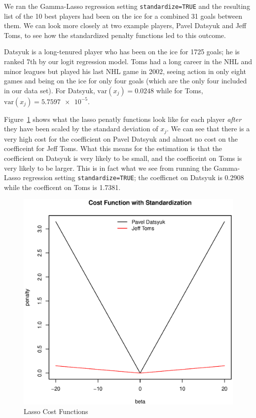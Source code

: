 \documentclass[11pt, fleqn]{article}
\begin{document}
We ran the Gamma-Lasso regression setting \texttt{standardize=TRUE} and the resulting list of the 10 best players had been on the ice for a combined 31 goals between them. We can look more closely at two example players, Pavel Datsyuk and Jeff Toms, to see how the standardized penalty functions led to this outcome.

Datsyuk is a long-tenured player who has been on the ice for 1725 goals; he is ranked 7th by our logit regression model. Toms had a long career in the NHL and minor leagues but played his last NHL game in 2002, seeing action in only eight games and being on the ice for only four goals (which are the only four included in our data set). For Datsyuk, $\mathrm{var}(x_j)=0.0248$ while for Toms, $\mathrm{var}(x_j)=\num{5.7597e-5}$.

Figure~\ref{fig:cost_fcn} shows what the lasso penatly functions look like for each player \textit{after} they have been scaled by the standard deviation of $x_j$. We can see that there is a very high cost for the coefficient on Pavel Datsyuk and almost no cost on the coefficeint for Jeff Toms. What this means for the estimation is that the coefficient on Datsyuk is very likely to be small, and the coefficeint on Toms is very likely to be larger. This is in fact what we see from running the Gamma-Lasso regression setting \texttt{standardize=TRUE}; the coefficnet on Datsyuk is 0.2908 while the coefficent on Toms is 1.7381.

\begin{figure}[!htb]
  \centering
  \includegraphics[scale=.5]{cost_fcn.eps}
  \caption{Lasso Cost Functions}
  \label{fig:cost_fcn}
\end{figure}
\end{document}

